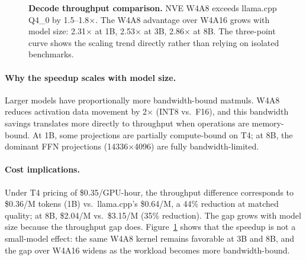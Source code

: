 \documentclass{article}
\begin{document}
\begin{figure}[H]
\centering
{}
\caption{\textbf{Decode throughput comparison.} NVE W4A8 exceeds llama.cpp
Q4\_0 by 1.5--1.8$\times$. The W4A8 advantage over W4A16 grows with model
size: 2.31$\times$ at 1B, 2.53$\times$ at 3B, 2.86$\times$ at 8B. The
three-point curve shows the scaling trend directly rather than relying on
isolated benchmarks.}
\label{fig:throughput_bars}
\end{figure}

\paragraph{Why the speedup scales with model size.} Larger models have proportionally more
bandwidth-bound matmuls. W4A8 reduces activation data movement by 2$\times$ (INT8 vs.\ F16),
and this bandwidth savings translates more directly to throughput when operations are
memory-bound. At 1B, some projections are partially compute-bound on T4; at 8B, the dominant
FFN projections (14336$\times$4096) are fully bandwidth-limited.

\paragraph{Cost implications.} Under T4 pricing of \$0.35/GPU-hour, the
throughput difference corresponds to \$0.36/M tokens (1B) vs.\ llama.cpp's
\$0.64/M, a 44\% reduction at matched quality; at 8B, \$2.04/M vs.\ \$3.15/M
(35\% reduction). The gap grows with model size because the throughput gap
does. Figure~\ref{fig:throughput_bars} shows that the speedup is not a
small-model effect: the same W4A8 kernel remains favorable at 3B and 8B, and
the gap over W4A16 widens as the workload becomes more bandwidth-bound.
\end{document}
